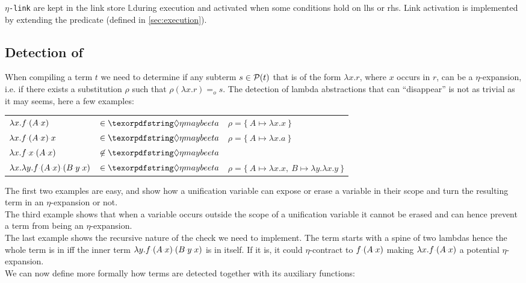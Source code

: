 \documentclass[sigconf,natbib=false,review]{acmart}
\newcommand{\appsep}{\ensuremath{\textcolor{lightgray}{\cdot}}}
\newcommand{\EqualRel}{\ensuremath{=}}
\newcommand{\Eo}{\ensuremath{\EqualRel_o}\xspace}
\newcommand{\linkMacro}[1]{\ensuremath{#1}\texttt{-link}\xspace}
\newcommand{\linketa} {\linkMacro{\eta}}
\newcommand{\lhs}{lhs\xspace}
\newcommand{\rhs}{rhs\xspace}
\newcommand{\linkStore}{\texorpdfstring{\ensuremath{\mathbb{L}}\xspace}{L}}
\begin{document}
\linketa are kept in the link store \linkStore during execution
and activated when some conditions hold on \lhs or \rhs.
Link activation is implemented by extending the 
predicate (defined in \cref{sec:execution}).

\subsection{Detection of \maybeeta}\label{sec:etadetection}

When compiling a term $t$ we need to determine if any
subterm $s \in \mathcal{P}(t)$ that is of the form $\lambda x. r$,
where $x$ occurs in $r$, can be a $\eta$-expansion, i.e. if
there exists a substitution $\rho$ such that $\rho (\lambda x.r) \Eo s$.
The detection of lambda abstractions that can ``disappear''
is not as trivial as it may seems, here a few examples:
%
\begin{center}
  \begin{tabular}{lll}
    $\lambda x. f \appsep (A \appsep x)$ & $\in\maybeeta$ & $\rho = \{~ A \mapsto \lambda x.x ~\}$ \\
    $\lambda x. f \appsep (A \appsep x) \appsep x$ & $\in\maybeeta$ & $\rho = \{~ A \mapsto \lambda x.a ~\}$\\
    $\lambda x. f \appsep x \appsep (A \appsep x)$ & $\not\in\maybeeta$ &\\
    $\lambda x. \lambda y. f \appsep (A \appsep x) \appsep (B \appsep y \appsep x)$ & $\in\maybeeta$ & $\rho = \{~ A \mapsto \lambda x.x,~ B \mapsto \lambda y.\lambda x.y ~\}$
  \end{tabular}
\end{center}
\vspace{4pt}

\noindent
The first two examples are easy, and show how a unification variable can expose
or erase a variable in their scope and turn the resulting term in an $\eta$-expansion or not.\\
The third example shows that when a variable occurs outside the scope of a unification
variable it cannot be erased and can hence prevent a term from being an $\eta$-expansion.\\
The last example shows the recursive nature of the check we need to implement.
The term starts with a spine of two lambdas hence the whole term
is in \maybeeta iff the inner term $\lambda y.f\appsep (A \appsep x) \appsep (B \appsep y \appsep x)$
is in \maybeeta itself. If it is, it could $\eta$-contract to
$f \appsep (A \appsep x)$ making $\lambda x.f \appsep (A \appsep x)$ a potential
$\eta$-expansion.\\
We can now define more formally how \maybeeta terms are detected together with
its auxiliary functions:
\end{document}
